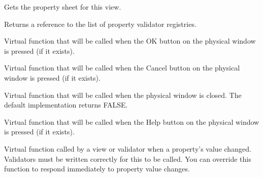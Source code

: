 \label{wxpropertyviewgetpropertysheet}


Gets the property sheet for this view.

\label{wxpropertyviewgetregistrylist}


Returns a reference to the list of property validator registries.

\label{wxpropertyviewonok}


Virtual function that will be called when the OK button on the physical window is pressed (if it exists).

\label{wxpropertyviewoncancel}


Virtual function that will be called when the Cancel button on the physical window is pressed (if it exists).

\label{wxpropertyviewonclose}


Virtual function that will be called when the physical window is closed. The default implementation returns FALSE.

\label{wxpropertyviewonhelp}


Virtual function that will be called when the Help button on the physical window is pressed (if it exists).

\label{wxpropertyviewonpropertychanged}


Virtual function called by a view or validator when a property's value changed. Validators
must be written correctly for this to be called. You can override this function
to respond immediately to property value changes.

\label{wxpropertyviewonupdateview}


